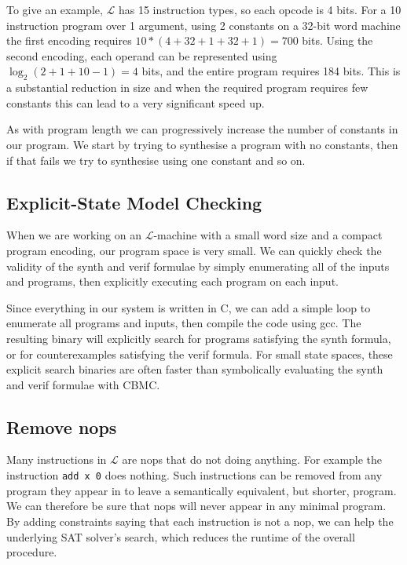 \documentclass[a4paper]{llncs}
\begin{document}
To give an example, $\mathcal{L}$ has 15 instruction types, so each opcode is 4 bits.
For a 10 instruction program over 1 argument, using 2 constants on a 32-bit word
machine the first encoding requires $10 * (4 + 32 + 1 + 32 + 1) = 700$ bits.
Using the second encoding, each operand can be represented using
$\log_2 (2 + 1 + 10 - 1) = 4$ bits, and the entire program requires 184 bits.
This is a substantial reduction in size and when the required program requires
few constants this can lead to a very significant speed up.

As with program length we can progressively increase the number of constants in
our program.  We start by trying to synthesise a program with no constants, then
if that fails we try to synthesise using one constant and so on.

\subsection{Explicit-State Model Checking}

When we are working on an $\mathcal{L}$-machine with a small word size and
a compact program encoding, our program space is very small.
We can quickly check the validity of the {\sc synth} and {\sc verif} formulae
by simply enumerating all of the inputs and programs, then explicitly
executing each program on each input.

Since everything in our system is written in C, we can add a simple loop
to enumerate all programs and inputs, then compile the code using {\sc gcc}.
The resulting binary will explicitly search for programs satisfying the {\sc synth}
formula, or for counterexamples satisfying the {\sc verif} formula.
For small state spaces, these explicit search binaries are often faster
than symbolically evaluating the {\sc synth} and {\sc verif} formulae with
{\sc CBMC}.

\subsection{Remove nops}
Many instructions in $\mathcal{L}$ are nops that do not doing anything.
For example the instruction \verb|add x 0| does nothing.  Such instructions
can be removed from any program they appear in to leave a semantically
equivalent, but shorter, program.  We can therefore be sure that nops
will never appear in any minimal program.  By adding constraints saying that
each instruction is not a nop, we can help the underlying SAT solver's
search, which reduces the runtime of the overall procedure.
\end{document}

